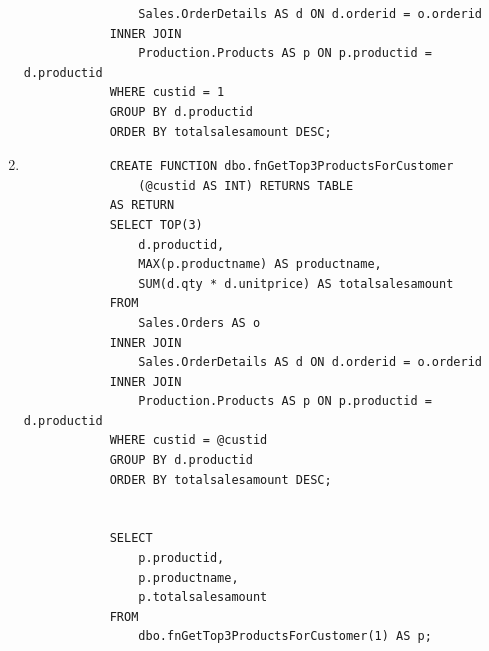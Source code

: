 \documentclass[12pt,titlepage]{article}
\begin{document}
\begin{enumerate}
{\begin{verbatim}
                Sales.OrderDetails AS d ON d.orderid = o.orderid
            INNER JOIN
                Production.Products AS p ON p.productid = d.productid
            WHERE custid = 1
            GROUP BY d.productid
            ORDER BY totalsalesamount DESC;
        \end{verbatim}
    }
    \pagebreak
    \item {
        \begin{verbatim}
            CREATE FUNCTION dbo.fnGetTop3ProductsForCustomer
                (@custid AS INT) RETURNS TABLE
            AS RETURN
            SELECT TOP(3)
                d.productid,
                MAX(p.productname) AS productname,
                SUM(d.qty * d.unitprice) AS totalsalesamount
            FROM
                Sales.Orders AS o
            INNER JOIN
                Sales.OrderDetails AS d ON d.orderid = o.orderid
            INNER JOIN
                Production.Products AS p ON p.productid = d.productid
            WHERE custid = @custid
            GROUP BY d.productid
            ORDER BY totalsalesamount DESC;


            SELECT
                p.productid,
                p.productname,
                p.totalsalesamount
            FROM 
                dbo.fnGetTop3ProductsForCustomer(1) AS p;
        \end{verbatim}
    }
\end{enumerate}
\end{document}
